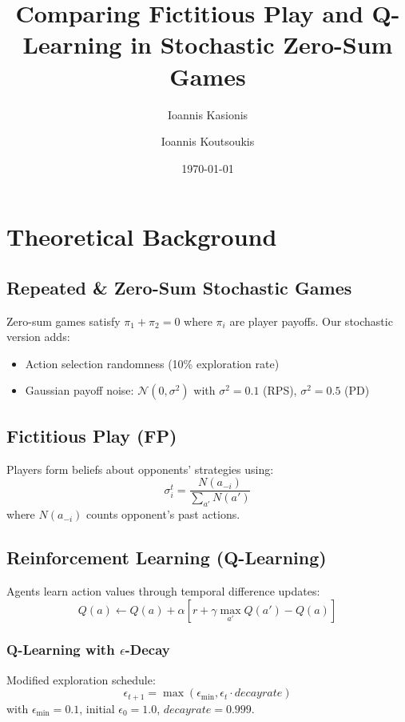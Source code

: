 \documentclass{article}
\title{Comparing Fictitious Play and Q-Learning in Stochastic Zero-Sum Games}
\author{Ioannis Kasionis \and Ioannis Koutsoukis}
\date{\today}
\begin{document}
\maketitle
\tableofcontents
\pagebreak

\section{Theoretical Background}
\subsection{Repeated \& Zero-Sum Stochastic Games}
Zero-sum games satisfy $\pi_1 + \pi_2 = 0$ where $\pi_i$ are player payoffs. Our stochastic version adds:
\begin{itemize}
\item Action selection randomness (10\% exploration rate)
\item Gaussian payoff noise: $\mathcal{N}(0,\sigma^2)$ with $\sigma^2=0.1$ (RPS), $\sigma^2=0.5$ (PD)
\end{itemize}

\subsection{Fictitious Play (FP)}
Players form beliefs about opponents' strategies using:
\begin{equation}
\sigma_i^t = \frac{N(a_{-i})}{\sum_{a'}{N(a')}}
\end{equation}
where $N(a_{-i})$ counts opponent's past actions.

\subsection{Reinforcement Learning (Q-Learning)}
Agents learn action values through temporal difference updates:
\begin{equation}
Q(a) \leftarrow Q(a) + \alpha\left[r + \gamma \max_{a'}Q(a') - Q(a)\right]
\end{equation}

\subsubsection{Q-Learning with $\epsilon$-Decay}
Modified exploration schedule:
\begin{equation}
\epsilon_{t+1} = \max\left(\epsilon_{\min}, \epsilon_t \cdot decayrate\right)
\end{equation}
with $\epsilon_{\min}=0.1$, initial $\epsilon_0=1.0$, $decayrate=0.999$.
\end{document}
